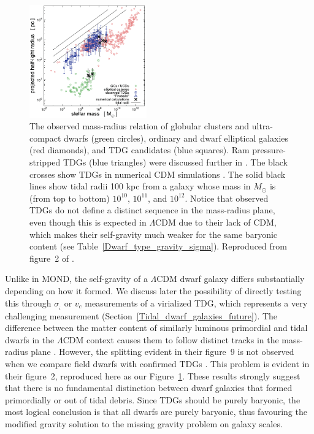 \documentclass[fleqn,usenatbib,useAMS,onecolumn]{mnras} %
\begin{document}
\begin{figure}
	\centering
	\includegraphics[width=0.45\textwidth]{Dabringhausen_2013_Figure_2}
	\caption{The observed mass-radius relation of globular clusters and ultra-compact dwarfs (green circles), ordinary and dwarf elliptical galaxies (red diamonds), and TDG candidates (blue squares). Ram pressure-stripped TDGs (blue triangles) were discussed further in \citet{Haslbauer_2019}. The black crosses show TDGs in numerical CDM simulations \citep{Wetzstein_2007}. The solid black lines show tidal radii 100 kpc from a galaxy whose mass in $M_\odot$ is (from top to bottom) $10^{10}$, $10^{11}$, and $10^{12}$. Notice that observed TDGs do not define a distinct sequence in the mass-radius plane, even though this is expected in $\Lambda$CDM \citep{Haslbauer_2019} due to their lack of CDM, which makes their self-gravity much weaker for the same baryonic content (see Table~\ref{Dwarf_type_gravity_sigma}). Reproduced from figure~2 of \citet{Dabringhausen_2013}.}
	\label{Dabringhausen_2013_Figure_2}
\end{figure}

Unlike in MOND, the self-gravity of a $\Lambda$CDM dwarf galaxy differs substantially depending on how it formed. We discuss later the possibility of directly testing this through $\sigma_{_i}$ or $v_c$ measurements of a virialized TDG, which represents a very challenging measurement (Section~\ref{Tidal_dwarf_galaxies_future}). The difference between the matter content of similarly luminous primordial and tidal dwarfs in the $\Lambda$CDM context causes them to follow distinct tracks in the mass-radius plane \citep{Haslbauer_2019}. However, the splitting evident in their figure~9 is not observed when we compare field dwarfs with confirmed TDGs \citep{Dabringhausen_2013}. This problem is evident in their figure~2, reproduced here as our Figure~\ref{Dabringhausen_2013_Figure_2}. These results strongly suggest that there is no fundamental distinction between dwarf galaxies that formed primordially or out of tidal debris. Since TDGs should be purely baryonic, the most logical conclusion is that all dwarfs are purely baryonic, thus favouring the modified gravity solution to the missing gravity problem on galaxy scales.
\end{document}

